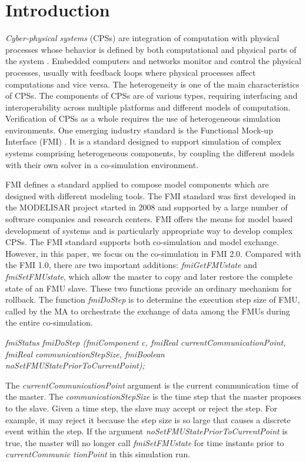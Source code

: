 \section{Introduction}

\textit{Cyber-physical systems} (CPSs)  are integration of computation with physical processes whose behavior is defined by both computational and physical parts of the system \cite{Zanero17}. Embedded computers and networks monitor and control the physical processes, usually with feedback loops where physical processes affect computations and vice versa. The heterogeneity is one of the main characteristics of CPSs. The components of CPSs are of various types, requiring interfacing and interoperability across multiple platforms and different models of computation. Verification of CPSs as a whole requires the use of heterogeneous simulation environments. One emerging industry
standard is the Functional Mock-up Interface (FMI) \cite{Blochwitz2011The}\cite{BromanBGLMTW13}. It
is a standard designed to support simulation of complex systems
comprising heterogeneous components, by coupling the different models with their own solver in a co-simulation environment.

FMI defines a standard applied to compose model components which are designed with different modeling tools. The FMI standard was first developed in the MODELISAR project started in 2008 and supported by a large number of software companies and research centers. FMI offers the means for model based development of systems and is particularly appropriate way to develop complex CPSs. The FMI standard supports both co-simulation and  model exchange. However, in this paper, we focus on the co-simulation in FMI 2.0.
Compared with the FMI 1.0, there are two important additions: \emph{fmiGetFMUstate} and \emph{fmiSetFMUstate}, which allow the master to copy and later restore the complete state of an FMU slave. These two functions provide an ordinary mechanism for rollback. The function \emph{fmiDoStep} is to determine the execution step size of FMU, called by the MA to orchestrate the exchange of data among the FMUs during the entire co-simulation. 

\emph{fmiStatus fmiDoStep (fmiComponent c, fmiReal currentCommunicationPoint, fmiReal communicationStepSize, fmiBoolean noSetFMUStatePriorToCurrentPoint);}

The \emph{currentCommunicationPoint} argument is the current communication time of the master. The \emph{communicationStepSize} is the time step that the master proposes to the slave. Given a time step, the slave may accept or reject the step. For example, it may reject it because the step size is so large that causes a discrete event within the step. If the argument \emph{noSetFMUStatePriorToCurrentPoint} is true, the master will no longer call \emph{fmiSetFMUstate} for time instants prior to \emph{currentCommunic tionPoint} in this simulation run. 

